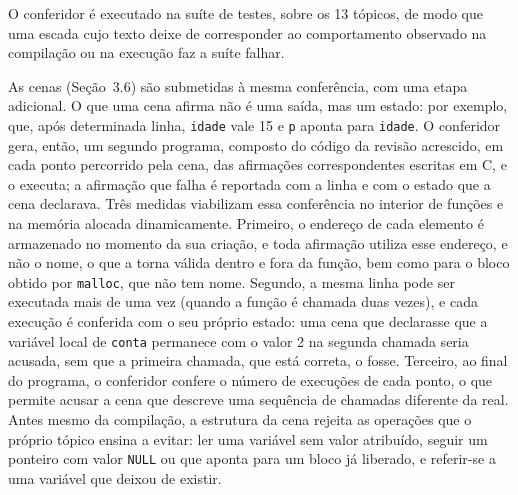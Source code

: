 O conferidor é executado na suíte de testes, sobre os 13 tópicos, de modo que uma escada cujo texto deixe de corresponder ao comportamento observado na compilação ou na execução faz a suíte falhar.

As cenas (Seção~3.6) são submetidas à mesma conferência, com uma etapa adicional. O que uma cena afirma não é uma saída, mas um estado: por exemplo, que, após determinada linha, \texttt{idade} vale 15 e \texttt{p} aponta para \texttt{idade}. O conferidor gera, então, um segundo programa, composto do código da revisão acrescido, em cada ponto percorrido pela cena, das afirmações correspondentes escritas em C, e o executa; a afirmação que falha é reportada com a linha e com o estado que a cena declarava. Três medidas viabilizam essa conferência no interior de funções e na memória alocada dinamicamente. Primeiro, o endereço de cada elemento é armazenado no momento da sua criação, e toda afirmação utiliza esse endereço, e não o nome, o que a torna válida dentro e fora da função, bem como para o bloco obtido por \texttt{malloc}, que não tem nome. Segundo, a mesma linha pode ser executada mais de uma vez (quando a função é chamada duas vezes), e cada execução é conferida com o seu próprio estado: uma cena que declarasse que a variável local de \texttt{conta} permanece com o valor 2 na segunda chamada seria acusada, sem que a primeira chamada, que está correta, o fosse. Terceiro, ao final do programa, o conferidor confere o número de execuções de cada ponto, o que permite acusar a cena que descreve uma sequência de chamadas diferente da real. Antes mesmo da compilação, a estrutura da cena rejeita as operações que o próprio tópico ensina a evitar: ler uma variável sem valor atribuído, seguir um ponteiro com valor \texttt{NULL} ou que aponta para um bloco já liberado, e referir-se a uma variável que deixou de existir.

